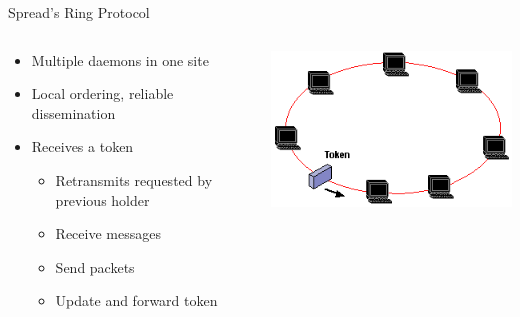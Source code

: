 \documentclass[pdftex]{beamer}
\begin{document}

\begin{frame}{Spread's Ring Protocol}
\begin{columns}
\begin{column}{.5\textwidth}

\begin{itemize}
	\item Multiple daemons in one site
	\item Local ordering, reliable dissemination
	\item Receives a token
	\begin{itemize}
		\item Retransmits requested by previous holder
		\item Receive messages
		\item Send packets
		\item Update and forward token
	\end{itemize}
\end{itemize}
\end{column}
	
\begin{column}{.5\textwidth}
\includegraphics[width=\textwidth]{token_ring}
\end{column}

\end{columns}
\end{frame}

\end{document}
